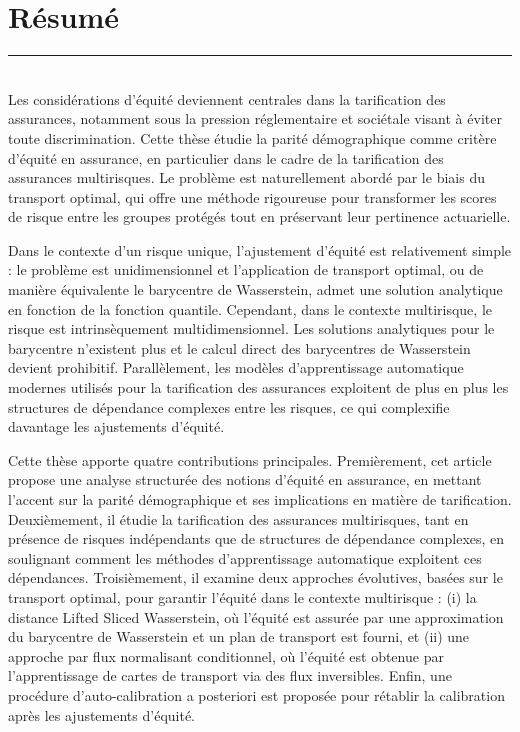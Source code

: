 \documentclass[
  a4paper,
  11pt,
  a4paper,
  twoside,
  openright]{report}
\begin{document}


\chapter*{Résumé}\label{ruxe9sumuxe9}


\thispagestyle{empty}
\noindent\rule{\textwidth}{0.4pt}\\[0.4em]

Les considérations d'équité deviennent centrales dans la tarification
des assurances, notamment sous la pression réglementaire et sociétale
visant à éviter toute discrimination. Cette thèse étudie la parité
démographique comme critère d'équité en assurance, en particulier dans
le cadre de la tarification des assurances multirisques. Le problème est
naturellement abordé par le biais du transport optimal, qui offre une
méthode rigoureuse pour transformer les scores de risque entre les
groupes protégés tout en préservant leur pertinence actuarielle.

Dans le contexte d'un risque unique, l'ajustement d'équité est
relativement simple : le problème est unidimensionnel et l'application
de transport optimal, ou de manière équivalente le barycentre de
Wasserstein, admet une solution analytique en fonction de la fonction
quantile. Cependant, dans le contexte multirisque, le risque est
intrinsèquement multidimensionnel. Les solutions analytiques pour le
barycentre n'existent plus et le calcul direct des barycentres de
Wasserstein devient prohibitif. Parallèlement, les modèles
d'apprentissage automatique modernes utilisés pour la tarification des
assurances exploitent de plus en plus les structures de dépendance
complexes entre les risques, ce qui complexifie davantage les
ajustements d'équité.

Cette thèse apporte quatre contributions principales. Premièrement, cet
article propose une analyse structurée des notions d'équité en
assurance, en mettant l'accent sur la parité démographique et ses
implications en matière de tarification. Deuxièmement, il étudie la
tarification des assurances multirisques, tant en présence de risques
indépendants que de structures de dépendance complexes, en soulignant
comment les méthodes d'apprentissage automatique exploitent ces
dépendances. Troisièmement, il examine deux approches évolutives, basées
sur le transport optimal, pour garantir l'équité dans le contexte
multirisque : (i) la distance Lifted Sliced Wasserstein, où l'équité est
assurée par une approximation du barycentre de Wasserstein et un plan de
transport est fourni, et (ii) une approche par flux normalisant
conditionnel, où l'équité est obtenue par l'apprentissage de cartes de
transport via des flux inversibles. Enfin, une procédure
d'auto-calibration a posteriori est proposée pour rétablir la
calibration après les ajustements d'équité.
\end{document}
